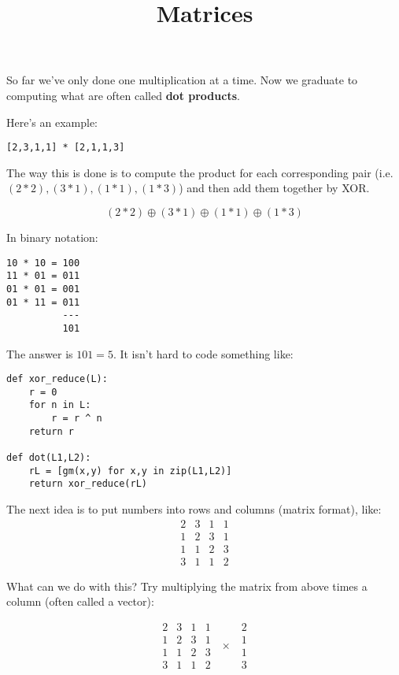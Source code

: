 \documentclass[11pt, oneside]{article}
\title{Matrices}
\date{}
\begin{document}
\maketitle
\Large
So far we've only done one multiplication at a time.  Now we graduate to computing what are often called \textbf{dot products}.

Here's an example:
\begin{verbatim}
[2,3,1,1] * [2,1,1,3]
\end{verbatim}

The way this is done is to compute the product for each corresponding pair (i.e. $(2 * 2), (3 * 1), (1 * 1), (1 * 3)$) and then add them together by XOR.

\[ (2 * 2) \oplus (3 * 1) \oplus (1 * 1) \oplus (1 * 3) \]

In binary notation:

\begin{verbatim}
10 * 10 = 100
11 * 01 = 011
01 * 01 = 001
01 * 11 = 011
          ---
          101
\end{verbatim}
The answer is $101 = 5$.  It isn't hard to code something like:
\begin{verbatim}
def xor_reduce(L):
    r = 0
    for n in L:
        r = r ^ n
    return r

def dot(L1,L2):
    rL = [gm(x,y) for x,y in zip(L1,L2)]
    return xor_reduce(rL)
\end{verbatim}

The next idea is to put numbers into rows and columns (matrix format), like:
\[
\begin{matrix}
2 & 3 & 1 & 1 \\
1 & 2 & 3 & 1 \\
1 & 1 & 2 & 3 \\
3 & 1 & 1 & 2
\end{matrix}
\]

What can we do with this?  Try multiplying the matrix from above times a column (often called a vector):

\[
\begin{matrix}
2 & 3 & 1 & 1 \\
1 & 2 & 3 & 1 \\
1 & 1 & 2 & 3 \\
3 & 1 & 1 & 2
\end{matrix}
\ \ \times \ \ 
\begin{matrix}
2 \\
1 \\
1 \\
3 
\end{matrix}
\]
\end{document}
